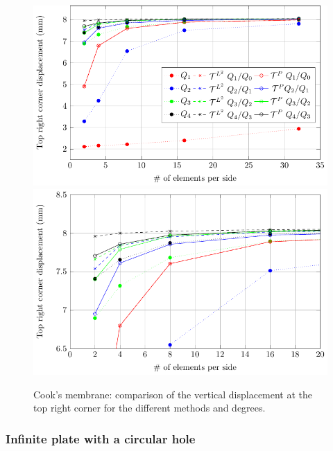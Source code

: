 \documentclass{article}
\begin{document}
\begin{figure}[ht]
	\centering
	\includegraphics[width=.8\linewidth]{Cook_s_membrane}
   	\includegraphics[width=.8\linewidth]{Cook_s_membrane_zoomin}
	\caption{Cook's membrane: comparison of the vertical displacement at the top right corner for the different methods and degrees.}
	\label{fig:Cook's_result}
\end{figure}

\clearpage

\subsubsection{Infinite plate with a circular hole}
\end{document}
